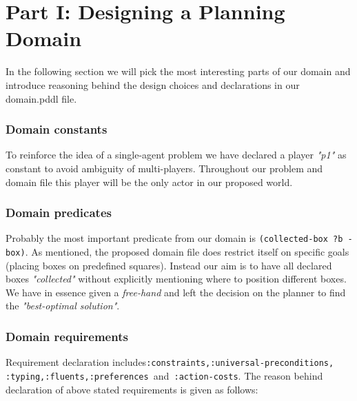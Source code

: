 \documentclass[letterpaper]{article} %
\begin{document}
\section{Part I: Designing a Planning Domain}
In the following section we will pick the most interesting parts of our domain and introduce reasoning behind the design choices and declarations in our domain.pddl file.

\subsubsection{Domain constants}
To reinforce the idea of a single-agent problem we have declared a player \emph{"p1"} as constant to avoid ambiguity of multi-players. Throughout our problem and domain file this player will be the only actor in our proposed world.

\subsubsection{Domain predicates}
Probably the most important predicate from our domain is \texttt{(collected-box ?b -box)}. As mentioned, the proposed domain file does restrict itself on specific goals (placing boxes on predefined squares). Instead our aim is to have all declared boxes \emph{"collected"} without explicitly mentioning where to position different boxes. We have in essence given a \emph{free-hand} and left the decision on the planner to find the \emph{"best-optimal solution"}.

\subsubsection{Domain requirements}
Requirement declaration includes\texttt{:constraints,:universal-preconditions, :typing,:fluents,:preferences }and\texttt{ :action-costs}. The reason behind declaration of above stated requirements is given as follows:
\end{document}
